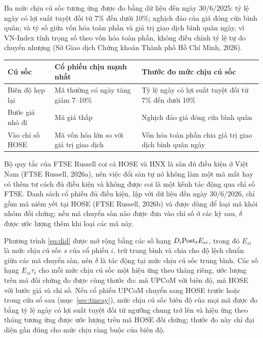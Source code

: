 Ba mức chịu cú sốc tương ứng được đo bằng dữ liệu đến ngày 30/6/2025: tỷ lệ ngày có lợi suất tuyệt đối từ 7\% đến dưới 10\%; nghịch đảo của giá đóng cửa bình quân; và tỷ số giữa vốn hóa toàn phần và giá trị giao dịch bình quân ngày, vì VN-Index tính trọng số theo vốn hóa toàn phần, không điều chỉnh tỷ lệ tự do chuyển nhượng (Sở Giao dịch Chứng khoán Thành phố Hồ Chí Minh, 2026).

\begin{center}
\label{tab:cusoc}
{\bangnho
\begin{tabularx}{\textwidth}{@{}>{\raggedright\arraybackslash}p{} L L@{}}
\toprule
Cú sốc & Cổ phiếu chịu mạnh nhất & Thước đo mức chịu cú sốc\\
\midrule
Biên độ hẹp lại & Mã thường có ngày tăng giảm 7--10\% & Tỷ lệ ngày có lợi suất tuyệt đối từ 7\% đến dưới 10\%\\
Bước giá nhỏ đi & Mã giá thấp & Nghịch đảo giá đóng cửa bình quân\\
Vào chỉ số HOSE & Mã vốn hóa lớn so với giá trị giao dịch & Vốn hóa toàn phần chia giá trị giao dịch bình quân ngày\\
\bottomrule
\end{tabularx}}
\end{center}

Bộ quy tắc của FTSE Russell coi cả HOSE và HNX là sàn đủ điều kiện ở Việt Nam (FTSE Russell, 2026a), nên việc đổi sàn tự nó không làm một mã mất hay có thêm tư cách đủ điều kiện và không được coi là một kênh tác động qua chỉ số FTSE. Danh sách cổ phiếu đủ điều kiện, lập với dữ liệu đến ngày 30/6/2026, chỉ gồm mã niêm yết tại HOSE (FTSE Russell, 2026b) và được dùng để loại mã khỏi nhóm đối chứng; nếu mã chuyển sàn nào được đưa vào chỉ số ở các kỳ sau, $\delta$ được ước lượng thêm khi loại các mã này.

Phương trình \eqref{eq:did} được mở rộng bằng các số hạng $D_i\mathrm{Post}_tE_{si}$, trong đó $E_{si}$ là mức chịu cú sốc $s$ của cổ phiếu $i$, trừ trung bình và chia cho độ lệch chuẩn giữa các mã chuyển sàn, nên $\delta$ là tác động tại mức chịu cú sốc trung bình. Các số hạng $E_{si}\tau_t$ cho mỗi mức chịu cú sốc một hiệu ứng theo tháng riêng, ước lượng trên mã đối chứng đo được cùng thước đo: mã UPCoM với biên độ, mã HOSE với bước giá và chỉ số. Nếu cổ phiếu UPCoM chuyển sang HOSE trước hoặc trong cửa sổ sau (mục~\ref{sec:tincay}), mức chịu cú sốc biên độ của mọi mã được đo bằng tỷ lệ ngày có lợi suất tuyệt đối từ ngưỡng chung trở lên và hiệu ứng theo tháng tương ứng được ước lượng trên mã HOSE đối chứng; thước đo này chỉ đại diện gần đúng cho mức chịu ràng buộc của biên độ.

